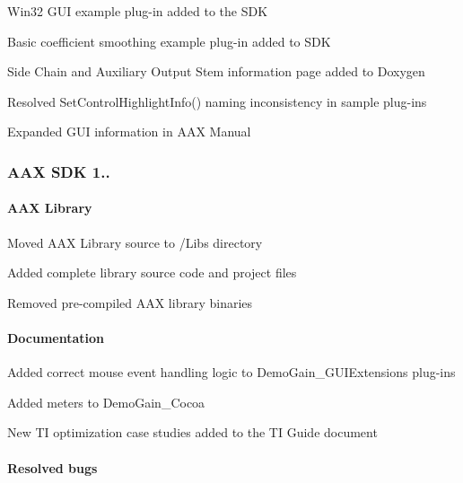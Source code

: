 \begin{DoxyItemize}
\item Win32 G\+UI example plug-\/in added to the S\+DK 
\item Basic coefficient smoothing example plug-\/in added to S\+DK 
\item Side Chain and Auxiliary Output Stem information page added to Doxygen 
\item Resolved Set\+Control\+Highlight\+Info() naming inconsistency in sample plug-\/ins 
\item Expanded G\+UI information in A\+AX Manual 
\end{DoxyItemize}\hypertarget{a00847_aax_sdk_1p0p2}{}\subsubsection{A\+A\+X S\+D\+K 1..}\label{a00847_aax_sdk_1p0p2}
\hypertarget{a00847_aax_sdk_1p0p2_AAXLibrary}{}\paragraph{A\+A\+X Library}\label{a00847_aax_sdk_1p0p2_AAXLibrary}

\begin{DoxyItemize}
\item Moved A\+AX Library source to /\+Libs directory 
\item Added complete library source code and project files 
\item Removed pre-\/compiled A\+AX library binaries  
\end{DoxyItemize}\hypertarget{a00847_aax_sdk_1p0p2_Documentation}{}\paragraph{Documentation}\label{a00847_aax_sdk_1p0p2_Documentation}

\begin{DoxyItemize}
\item Added correct mouse event handling logic to Demo\+Gain\+\_\+\+G\+U\+I\+Extensions plug-\/ins 
\item Added meters to Demo\+Gain\+\_\+\+Cocoa 
\item New TI optimization case studies added to the TI Guide document 
\end{DoxyItemize}\hypertarget{a00847_aax_sdk_1p0p2_ResolvedBugs}{}\paragraph{Resolved bugs}\label{a00847_aax_sdk_1p0p2_ResolvedBugs}

